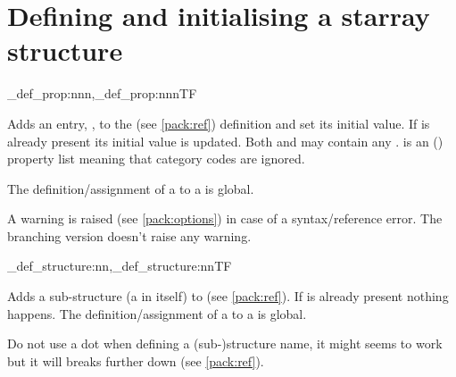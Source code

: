 \documentclass[10pt]{article}
\begin{document}
\section{Defining and initialising a starray structure}\label{pack:def}

\begin{codedescribe}{\starray_def_prop:nnn,\starray_def_prop:nnnTF}
\begin{codesyntax}%
\end{codesyntax}
Adds an entry, , to the  (see \ref{pack:ref}) definition and set its initial value. If  is already present its initial value is updated. Both  and  may contain any .  is an () property list  meaning that category codes are ignored.

The definition/assignment of a  to a  is global.
\end{codedescribe}

\begin{tsremark}
A warning is raised (see \ref{pack:options}) in case of a  syntax/reference error. The branching version doesn't raise any warning.
\end{tsremark}

\begin{codedescribe}{\starray_def_structure:nn,\starray_def_structure:nnTF}
\begin{codesyntax}%
\end{codesyntax}
Adds a sub-structure (a  in itself) to  (see \ref{pack:ref}). If  is already present nothing happens. The definition/assignment of a  to a  is global.
\end{codedescribe}


\begin{tsremark}
Do not use a dot when defining a (sub-)structure name, it might seems to work but it will breaks further down (see \ref{pack:ref}).
\end{tsremark}
\end{document}
